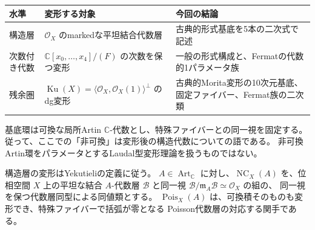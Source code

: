 \documentclass[a4paper,11pt]{ltjsarticle}
\newcommand{\mathscr}{\mathcal}
\theoremstyle{definition}
\newcommand{\CC}{\mathbb C}
\newcommand{\OO}{\mathcal O}
\newcommand{\Ku}{\operatorname{Ku}}
\newcommand{\Art}{\operatorname{Art}_{\CC}}
\newcommand{\NC}{\operatorname{NC}}
\newcommand{\Pois}{\operatorname{Pois}}
\newcommand{\frakm}{\mathfrak m}
\begin{document}
\begin{center}
\small
\begin{tabular}{p{}p{}p{}}
\toprule
水準 & 変形する対象 & 今回の結論\\
\midrule
構造層 &
$\OO_X$ のmarkedな平坦結合代数層 &
古典的形式基底を5本の二次式で記述\\
次数付き代数 &
$\CC[x_0,\ldots,x_4]/(F)$ の次数を保つ変形 &
一般の形式構成と、Fermatの代数的1パラメータ族\\
残余圏 &
$\Ku(X)=\langle\OO_X,\OO_X(1)\rangle^\perp$ のdg変形 &
古典的Morita変形の10次元基底、固定ファイバー、Fermat族の二次類\\
\bottomrule
\end{tabular}
\end{center}

基底環は可換な局所Artin $\CC$-代数とし、特殊ファイバーとの同一視を固定する。
従って、ここでの「非可換」は変形後の構造代数についての語である。
非可換Artin環をパラメータとするLaudal型変形理論を扱うものではない。

構造層の変形はYekutieliの定義\cite[Definitions 2.7--2.8]{Yek}に従う。
$A\in\Art$ に対し、$\NC_X(A)$ を、位相空間 $X$ 上の平坦な結合 $A$-代数層
$\mathscr B$ と同一視 $\mathscr B/\frakm_A\mathscr B\simeq\OO_X$ の組の、
同一視を保つ代数層同型による同値類とする。
$\Pois_X(A)$ は、可換積そのものも変形でき、特殊ファイバーで括弧が零となる
Poisson代数層の対応する関手である。
\end{document}
